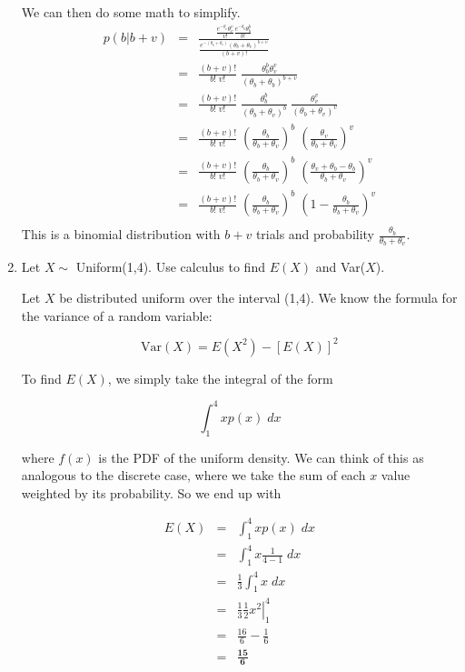\documentclass[10pt,a4paper]{article}
\newcommand{\red}{\color{red}}
\newcommand{\black}{\color{black}}
\begin{document}
\begin{enumerate}
We can then do some math to simplify.
\begin{eqnarray*}
p(b|b+v) &=& \frac{\frac{e^{-\theta_v} \theta_v^v}{v!}
\frac{e^{-\theta_b} \theta_b^b}{b!}}{\frac{e^{-(\theta_b + \theta_v)}
(\theta_b + \theta_v)^{b+v}}{(b+v)!}}\\
&=& \frac{(b+v)!}{b! \; v!} \; \frac{\theta_b^b \theta_v^v}{(\theta_b +
\theta_b)^{b+v}} \\
&=& \frac{(b+v)!}{b! \; v!} \; \frac{\theta_b^b}{(\theta_b +
\theta_v)^{b}} \; \frac{\theta_v^v}{(\theta_b + \theta_v)^{v}}\\
&=& \frac{(b+v)!}{b! \; v!} \; \left( \frac{\theta_b}{\theta_b +
\theta_v} \right)^b \; \left( \frac{\theta_v}{\theta_b + \theta_v} \right)^v\\
&=& \frac{(b+v)!}{b! \; v!} \; \left( \frac{\theta_b}{\theta_b +
\theta_v} \right)^b \; \left( \frac{\theta_v + \theta_b - \theta_b}{\theta_b + \theta_v} \right)^v\\
&=& \frac{(b+v)!}{b! \; v!} \; \left( \frac{\theta_b}{\theta_b +
\theta_v} \right)^b \; \left(1 - \frac{\theta_b}{\theta_b + \theta_v} \right)^v\\
\end{eqnarray*}
This is a binomial distribution with $b+v$ trials and probability $\frac{\theta_b}{\theta_b + \theta_v}$.
\black 



\bigskip 

\item Let $X \sim$ Uniform(1,4). Use calculus to find $E(X)$ and Var($X$). 

\medskip \red
Let $X$ be distributed uniform over the interval (1,4).  We know the
formula for the variance of a random variable:

\begin{equation*}
 \mathrm{Var}(X) = E(X^2) - [E(X)]^2
\end{equation*}

To find $E(X)$, we simply take the integral of the form

\begin{equation*}
 \int_1^4 x p(x) \; dx
\end{equation*}

where $f(x)$ is the PDF of the uniform density.  We can think of this
as analogous to the discrete case, where we take the sum of each $x$
value weighted by its probability.  So we end up with

\begin{eqnarray*}
 E(X) &=& \int_1^4 x p(x) \; dx\\
&=& \int_1^4 x \frac{1}{4-1} \; dx\\
&=& \frac{1}{3} \int_1^4 x \; dx\\
&=& \frac{1}{3} \left. \frac{1}{2} x^2 \right| ^4_1\\ 
&=& \frac{16}{6} - \frac{1}{6}\\
&=& \mathbf{\frac{15}{6}} 
\end{eqnarray*} 


\end{enumerate}
\end{document}
